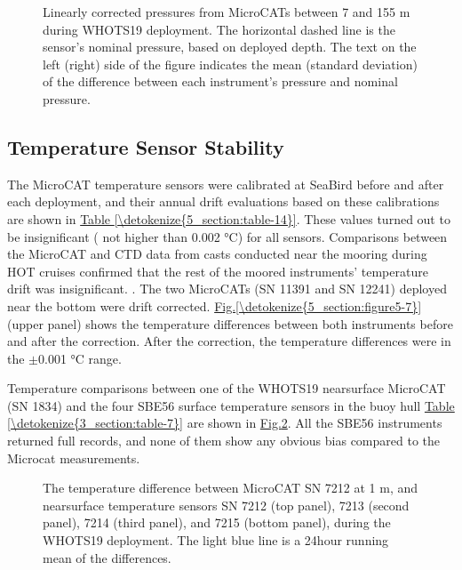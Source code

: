 \documentclass[a4paper,10pt,english,openany,oneside]{sphinxmanual}
\let\sphinxpxdimen\pdfpxdimen\else\newdimen\sphinxpxdimen
\begin{document}
\begin{figure}[htbp]
\centering
\capstart

\noindent\sphinxincludegraphics[height=1000\sphinxpxdimen]{{w19pbias_a}.png}
\caption{Linearly corrected pressures from MicroCATs between 7 and 155 m during
WHOTS\sphinxhyphen{}19 deployment. The horizontal dashed line is the sensor’s nominal
pressure, based on deployed depth. The text on the left (right) side of the
figure indicates the mean (standard deviation) of the difference between each
instrument’s pressure and nominal pressure.}\label{\detokenize{5_section:figure5-1}}\end{figure}


\subsection{Temperature Sensor Stability}
\label{\detokenize{5_section:temperature-sensor-stability}}
\sphinxAtStartPar
The MicroCAT temperature sensors were calibrated at Sea\sphinxhyphen{}Bird before and after
each deployment, and their annual drift evaluations based on these calibrations
are shown in \hyperref[\detokenize{5_section:table-14}]{Table \ref{\detokenize{5_section:table-14}}}. These values turned out to be insignificant (
not higher than 0.002 °C) for all sensors. Comparisons between the MicroCAT and
CTD data from casts conducted near the mooring during HOT cruises confirmed
that the rest of the moored instruments’ temperature drift was insignificant. .
The two MicroCATs (SN 11391 and SN 12241) deployed near the bottom were drift
corrected. \hyperref[\detokenize{5_section:figure5-7}]{Fig.\@ \ref{\detokenize{5_section:figure5-7}}} (upper panel) shows the temperature differences
between both instruments before and after the correction. After the correction,
the temperature differences were in the \(\pm\)0.001 °C range.

\sphinxAtStartPar
Temperature comparisons between one of the WHOTS\sphinxhyphen{}19 near\sphinxhyphen{}surface MicroCAT
(SN 1834) and the four SBE\sphinxhyphen{}56 surface temperature sensors in the buoy hull
\hyperref[\detokenize{3_section:table-7}]{Table \ref{\detokenize{3_section:table-7}}} are shown in \hyperref[\detokenize{5_section:figure5-2}]{Fig.\@ \ref{\detokenize{5_section:figure5-2}}}. All the SBE\sphinxhyphen{}56 instruments
returned full records, and none of them show any obvious bias compared to the
Microcat measurements.

\begin{figure}[htbp]
\centering
\capstart

\noindent\sphinxincludegraphics[height=1000\sphinxpxdimen]{{w19tcompare_1}.png}
\caption{The temperature difference between MicroCAT SN 7212 at 1 m, and near\sphinxhyphen{}surface
temperature sensors SN 7212 (top panel), 7213 (second panel), 7214 (third
panel), and 7215 (bottom panel), during the WHOTS\sphinxhyphen{}19 deployment. The light blue
line is a 24\sphinxhyphen{}hour running mean of the differences.}\label{\detokenize{5_section:figure5-2}}\end{figure}
\end{document}

